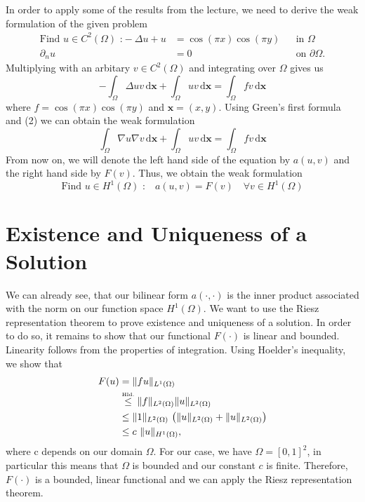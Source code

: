 \documentclass[a4paper,12pt]{article}
\begin{document}
In order to apply some of the results from the lecture, we need to derive the weak formulation of the given problem 
\begin{align}
\mbox{Find } u\in C^2(\Omega)\mbox{ :}-\Delta u+u &= \cos(\pi x)\cos(\pi y) &&\mbox{in } \Omega \\
\partial _n u &= 0 &&\mbox{on } \partial\Omega.
\end{align}
Multiplying with an arbitary $v\in C^2(\Omega)$ and integrating over $\Omega$ gives us
\[-\int _\Omega \Delta uv \,\mbox{d} \bm{x} + \int _\Omega uv \,\mbox{d} \bm{x} = \int _ \Omega fv\,\mbox{d} \bm{x}\]
where $f=\cos(\pi x)\cos(\pi y)$ and $\bm{x}=(x,y)$. Using Green's first formula and (2) we can obtain the weak formulation
\[\int _\Omega \nabla u\nabla v \,\mbox{d} \bm{x} + \int _\Omega uv \,\mbox{d} \bm{x} = \int _ \Omega fv\,\mbox{d} \bm{x}\]
From now on, we will denote the left hand side of the equation by $a(u,v)$ and the right hand side by $F(v)$. Thus, we obtain the weak formulation
\begin{equation}
\mbox{Find }u\in H^1(\Omega) \mbox{ :} \quad a(u,v)=F(v)\quad \forall v \in H^1(\Omega)
\end{equation}

\section{Existence and Uniqueness of a Solution}

We can already see, that our bilinear form $a(\cdotp ,\cdot)$ is the inner product associated with the norm on our function space $H^1(\Omega)$. We want to use the Riesz representation theorem to prove existence and uniqueness of a solution. In order to do so, it remains to show that our functional $F(\cdot)$ is linear and bounded. Linearity follows from the properties of integration. Using Hoelder's inequality, we show that
\begin{align*}
F(u)&=\|fu\|_{L^1(\Omega)}\\
	&\stackrel{\tiny\mbox{Hld.}}{\le} \|f\|_{L^2(\Omega)}\|u\|_{L^2(\Omega)}\\
	&\le \|1\|_{L^2(\Omega)}\ \big(\|u\|_{L^2(\Omega)}+\|u\|_{L^2(\Omega)}\big)\\
	&\le c\ \|u\|_{H^1(\Omega)}\mbox{,}
\end{align*}
where c depends on our domain $\Omega$. For our case, we have $\Omega=[0,1]^2$, in particular this means that $\Omega$ is bounded and our constant $c$ is finite. Therefore, $F(\cdot)$ is a bounded, linear functional and we can apply the Riesz representation theorem.
\end{document}
